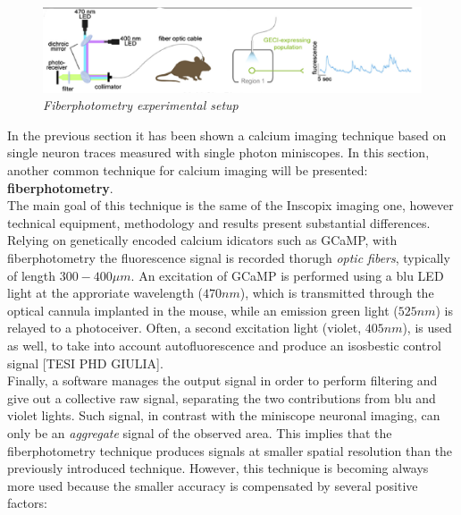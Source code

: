 \documentclass[a4paper]{article}
\begin{document}
\begin{figure}[H]
	\begin{center}
		\includegraphics[scale=.50]{fiberphotometry.png} 
	\end{center} 
	\caption{\textit{Fiberphotometry experimental setup}}
	
\end{figure}

In the previous section it has been shown a calcium imaging technique based on single neuron traces measured with single photon miniscopes. In this section, another common technique for calcium imaging will be presented: \textbf{fiberphotometry}. \\
The main goal of this technique is the same of the Inscopix imaging one, however technical equipment, methodology and results present substantial differences.\\
Relying on genetically encoded calcium idicators such as GCaMP, with fiberphotometry the fluorescence signal is recorded thorugh \textit{optic fibers}, typically of length $300-400 \mu m$. An excitation of GCaMP is performed using a blu LED light at the approriate wavelength ($470 nm$), which is transmitted through the optical cannula implanted in the mouse, while an emission green light ($525 nm$) is relayed to a photoceiver. Often, a second excitation light (violet, $405 nm$), is used as well, to take into account autofluorescence and produce an isosbestic control signal [TESI PHD GIULIA].\\
 Finally, a software manages the output signal in order to perform filtering and give out a collective raw signal, separating the two contributions from blu and violet lights. Such signal, in contrast with the miniscope neuronal imaging, can only be an \textit{aggregate} signal of the observed area. This implies that the fiberphotometry technique produces signals at smaller spatial resolution than the previously introduced technique. However, this technique is becoming always more used because the smaller accuracy is compensated by several positive factors:
\end{document}
